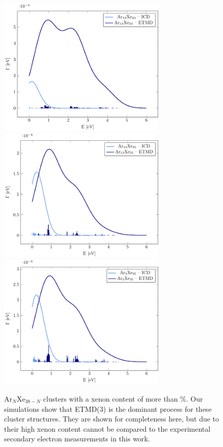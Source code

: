 \begin{figure}
 \centering
 \includegraphics[width=8.0cm]{pics/Ar14Xe24.pdf}
 \includegraphics[width=8.0cm]{pics/Ar13Xe25.pdf}
 \includegraphics[width=8.0cm]{pics/Ar3Xe35.pdf}
 \caption{Ar$_N$Xe$_{38-N}$ clusters with a xenon content of more
          than \unit[50]{\%}.
          Our simulations show that ETMD(3) is the dominant process
          for these cluster structures.
          They are shown for completeness here, but due to their high xenon
          content cannot be compared to the experimental 
          secondary electron measurements in this work.}
 \label{figure:ArXe_gt50}
\end{figure}



